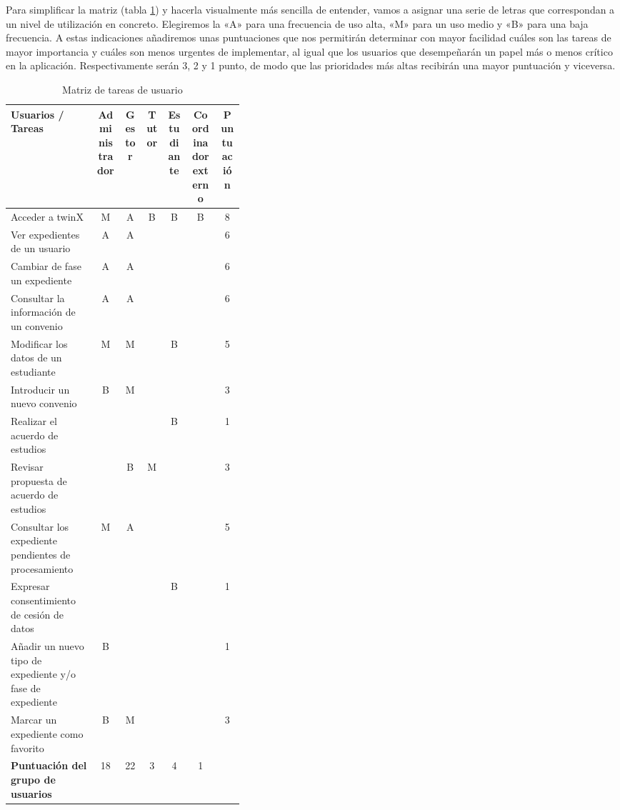 Para simplificar la matriz (tabla \ref{tab:matrizTareas}) y hacerla visualmente más sencilla de entender, vamos a asignar una serie de letras que correspondan a un nivel de utilización en concreto. Elegiremos la «A» para una frecuencia de uso alta, «M» para un uso medio y «B» para una baja frecuencia. A estas indicaciones añadiremos unas puntuaciones que nos permitirán determinar con mayor facilidad cuáles son las tareas de mayor importancia y cuáles son menos urgentes de implementar, al igual que los usuarios que desempeñarán un papel más o menos crítico en la aplicación. Respectivamente serán 3, 2 y 1 punto, de modo que las prioridades más altas recibirán una mayor puntuación y viceversa.

\begin{table}[h]
	\begin{center}
		\begin{adjustbox}{width=1\textwidth}
			\begin{tabular}{ | >{\centering\arraybackslash}p{0.375\linewidth} | c | c | c | c | c | c | } 
				\hline
				\textbf{Usuarios / Tareas} & \textbf{Administrador} & \textbf{Gestor} & \textbf{Tutor} & \textbf{Estudiante} & \textbf{Coordinador externo} & \textbf{Puntuación} \\
				\hline
				Acceder a twinX & M & A & B & B & B & \cellcolor{red!25}8 \\
				\hline
				Ver expedientes de un usuario & A & A & & & & \cellcolor{red!25}6 \\
				\hline
				Cambiar de fase un expediente & A & A & & & & \cellcolor{red!25}6 \\ 
				\hline
				Consultar la información de un convenio & A & A & & & & \cellcolor{red!25}6 \\ 
				\hline
				Modificar los datos de un estudiante & M & M & & B & & \cellcolor{red!25}5 \\
				\hline
				Introducir un nuevo convenio & B & M & & & & 3 \\
				\hline
				Realizar el acuerdo de estudios & & & & B & & 1 \\
				\hline
				Revisar propuesta de acuerdo de estudios & & B & M & & & 3 \\
				\hline
				Consultar los expediente pendientes de procesamiento & M & A & & & & 5 \\
				
				\hline
				Expresar consentimiento de cesión de datos & & & & B & & 1 \\
				\hline
				Añadir un nuevo tipo de expediente y/o fase de expediente & B & & &  & & 1 \\
				\hline
				Marcar un expediente como favorito & B & M & & & & 3 \\
				\hline	
				\textbf{Puntuación del grupo de usuarios} & \cellcolor{red!25}18 & \cellcolor{red!25}22 & 3 & 4 & 1 &  \\
				\hline
		\end{tabular}
	\end{adjustbox}
		\caption{Matriz de tareas de usuario}
		\label{tab:matrizTareas}
	\end{center}
\end{table}

